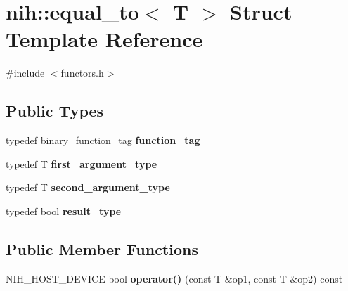 \hypertarget{structnih_1_1equal__to}{
\section{nih\-:\-:equal\-\_\-to$<$ \-T $>$ \-Struct \-Template \-Reference}
\label{structnih_1_1equal__to}
}


{\ttfamily \#include $<$functors.\-h$>$}

\subsection*{\-Public \-Types}
\begin{DoxyCompactItemize}
\item 
\hypertarget{structnih_1_1equal__to_a8d358253bbf0a92319f79abfa539a103}{
typedef \hyperlink{structnih_1_1binary__function__tag}{binary\-\_\-function\-\_\-tag} {\bfseries function\-\_\-tag}}
\label{structnih_1_1equal__to_a8d358253bbf0a92319f79abfa539a103}

\item 
\hypertarget{structnih_1_1equal__to_a67059669a6ee2df62b8e699f42d97872}{
typedef \-T {\bfseries first\-\_\-argument\-\_\-type}}
\label{structnih_1_1equal__to_a67059669a6ee2df62b8e699f42d97872}

\item 
\hypertarget{structnih_1_1equal__to_a29a92e1b5a0cf22d2735f498c7b129f4}{
typedef \-T {\bfseries second\-\_\-argument\-\_\-type}}
\label{structnih_1_1equal__to_a29a92e1b5a0cf22d2735f498c7b129f4}

\item 
\hypertarget{structnih_1_1equal__to_a47bd6232405d11ca7f29b4be509bfcc7}{
typedef bool {\bfseries result\-\_\-type}}
\label{structnih_1_1equal__to_a47bd6232405d11ca7f29b4be509bfcc7}

\end{DoxyCompactItemize}
\subsection*{\-Public \-Member \-Functions}
\begin{DoxyCompactItemize}
\item 
\hypertarget{structnih_1_1equal__to_a01cad1e90b318ec6aa7b35583d31552d}{
\-N\-I\-H\-\_\-\-H\-O\-S\-T\-\_\-\-D\-E\-V\-I\-C\-E bool {\bfseries operator()} (const \-T \&op1, const \-T \&op2) const }
\label{structnih_1_1equal__to_a01cad1e90b318ec6aa7b35583d31552d}

\end{DoxyCompactItemize}


